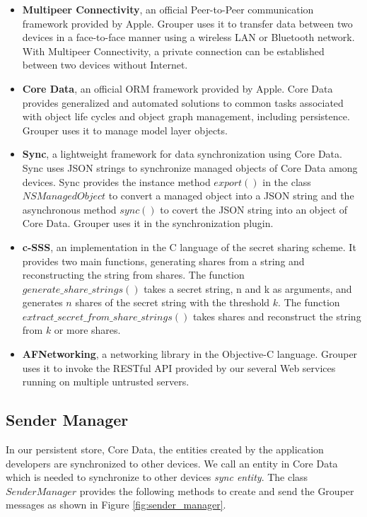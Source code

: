 \documentclass[a4paper,11pt]{report}
\begin{document}
\begin{itemize}[leftmargin=7mm]
	\setlength{\itemsep}{1pt}
	\setlength{\parskip}{0pt}
	\setlength{\parsep}{0pt}
	\item 
	\textbf{Multipeer Connectivity}\cite{mc}, an official Peer-to-Peer communication framework provided by Apple. 
	Grouper uses it to transfer data between two devices in a face-to-face manner using a wireless LAN or Bluetooth network.
	With Multipeer Connectivity, a private connection can be established between two devices without Internet.
	\item 
	\textbf{Core Data}\cite{coredata}, an official ORM framework provided by Apple.
	Core Data provides generalized and automated solutions to common tasks associated with object life cycles and object graph management, including persistence. 
	Grouper uses it to manage model layer objects. 
	\item 
	\textbf{Sync}\cite{sync}, a lightweight framework for data synchronization using Core Data.
	Sync uses JSON strings to synchronize managed objects of Core Data among devices.
	Sync provides the instance method $export()$ in the class $NSManagedObject$ to convert a managed object into a JSON string and the asynchronous method $sync()$ to covert the JSON string into an object of Core Data.
	Grouper uses it in the synchronization plugin.
	\item 
	\textbf{c-SSS}\cite{c-sss}, an implementation in the C language of the secret sharing scheme. 
	It provides two main functions, generating shares from a string and reconstructing the string from shares. The function $generate\_share\_strings()$ takes  a secret string, n and k as arguments, and generates $n$ shares of the secret string with the threshold $k$. The function $extract\_secret\_from\_share\_strings()$ takes shares and reconstruct the string from $k$ or more shares.
	\item 
	\textbf{AFNetworking}\cite{afnetworking}, a networking library in the Objective-C language. 
	Grouper uses it to invoke the RESTful API provided by our several Web services running on multiple untrusted servers. 
\end{itemize}

\subsection{Sender Manager} \label{subsection:sender_manager}

In our persistent store, Core Data\cite{coredata}, the entities created by the application developers are synchronized to other devices.
We call an entity in Core Data which is needed to synchronize to other devices \emph{sync entity}.
The class $SenderManager$ provides the following methods to create and send the Grouper messages as shown in Figure \ref{fig:sender_manager}.
\end{document}
